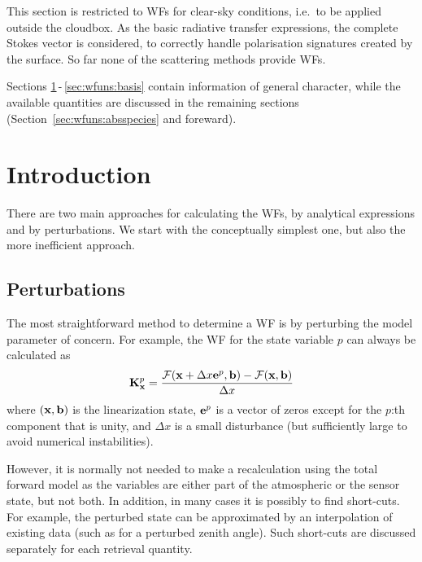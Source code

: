 This section is restricted to WFs for clear-sky conditions, i.e.\ to be applied
outside the cloudbox. As the basic radiative transfer expressions, the complete
Stokes vector is considered, to correctly handle polarisation signatures
created by the surface. So far none of the scattering methods provide WFs.

Sections \ref{sec:wfuns:intro}\,-\,\ref{sec:wfuns:basis} contain information
of general character, while the available quantities are discussed in the
remaining sections (Section~\ref{sec:wfuns:absspecies} and foreward).



\section{Introduction}
\label{sec:wfuns:intro}
%
There are two main approaches for calculating the WFs, by analytical
expressions and by perturbations. We start with the conceptually simplest one,
but also the more inefficient approach.



\subsection{Perturbations}
\label{sec:wfuns:pert}
%
The most straightforward method to determine a WF is by perturbing the model
parameter of concern. For example, the WF for the state variable $p$ can always
be calculated as
\begin{equation}
  \mathbf{K}_{\mathbf{x}}^p = \frac{\mathcal{F}(\mathbf{x}+\Delta x\mathbf{e}^p,\mathbf{b})-
                              \mathcal{F}(\mathbf{x},\mathbf{b})}{\Delta x}
 \label{eq:wfuns:perturb}
\end{equation}
where $(\mathbf{x},\mathbf{b})$ is the linearization state, $\mathbf{e}^p$ is a
vector of zeros except for the $p$:th component that is unity, and
$\Delta x$ is a small disturbance (but sufficiently large to avoid
numerical instabilities).

However, it is normally not needed to make a recalculation using the total
forward model as the variables are either part of the atmospheric or the sensor
state, but not both. In addition, in many cases it is possibly to find
short-cuts. For example, the perturbed state can be approximated by an
interpolation of existing data (such as for a perturbed zenith angle). Such
short-cuts are discussed separately for each retrieval quantity.


